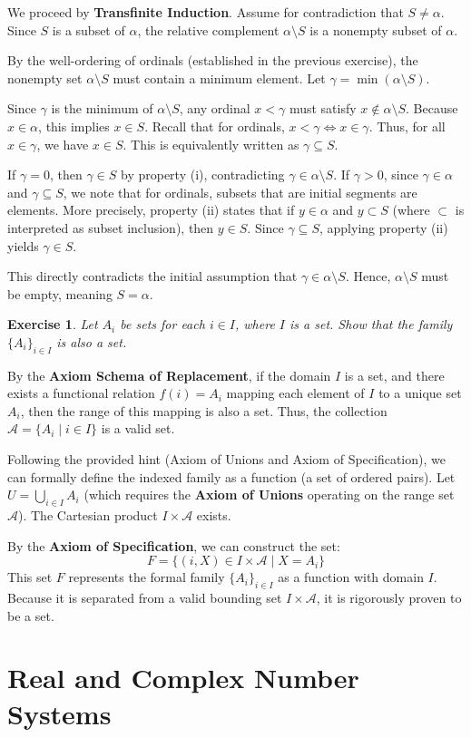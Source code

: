 \documentclass[12pt, a4paper]{article}
\makeatletter
\theoremstyle{break}
\newtheorem{exerciseitem}{Exercise}[section]
\newenvironment{exercise}
  {\begin{exerciseitem}\addcontentsline{toc}{subsection}{Exercise~\theexerciseitem}}
  {\end{exerciseitem}}
\renewenvironment{proof}[1][\proofname]{\par
  \pushQED{\qed}%
  \normalfont \topsep6\p@\@plus6\p@\relax
  \trivlist
  \item[\hskip\labelsep\bfseries #1\@addpunct{.}]\mbox{}\newline\ignorespaces
}{%
  \popQED\endtrivlist\@endpefalse
}
\newenvironment{solution}{\begin{proof}[Solution]}{\end{proof}}
\makeatother
\begin{document}
\begin{solution}
We proceed by \textbf{Transfinite Induction}. 
Assume for contradiction that \(S \neq \alpha\). Since \(S\) is a subset of \(\alpha\), the relative complement \(\alpha \setminus S\) is a nonempty subset of \(\alpha\). 

By the well-ordering of ordinals (established in the previous exercise), the nonempty set \(\alpha \setminus S\) must contain a minimum element. Let \(\gamma = \min(\alpha \setminus S)\).

Since \(\gamma\) is the minimum of \(\alpha \setminus S\), any ordinal \(x < \gamma\) must satisfy \(x \notin \alpha \setminus S\). Because \(x \in \alpha\), this implies \(x \in S\). 
Recall that for ordinals, \(x < \gamma \iff x \in \gamma\). Thus, for all \(x \in \gamma\), we have \(x \in S\). This is equivalently written as \(\gamma \subseteq S\). 

If \(\gamma = 0\), then \(\gamma \in S\) by property (i), contradicting \(\gamma \in \alpha \setminus S\).
If \(\gamma > 0\), since \(\gamma \in \alpha\) and \(\gamma \subseteq S\), we note that for ordinals, subsets that are initial segments are elements. More precisely, property (ii) states that if \(y \in \alpha\) and \(y \subset S\) (where \(\subset\) is interpreted as subset inclusion), then \(y \in S\). Since \(\gamma \subseteq S\), applying property (ii) yields \(\gamma \in S\).

This directly contradicts the initial assumption that \(\gamma \in \alpha \setminus S\). 
Hence, \(\alpha \setminus S\) must be empty, meaning \(S = \alpha\).
\end{solution}

\begin{exercise}\label{e1.28}
Let \(A_i\) be sets for each \(i \in I\), where \(I\) is a set. Show that the family \(\{A_i \}_{i\in I}\) is also a set.
\end{exercise}

\begin{solution}
By the \textbf{Axiom Schema of Replacement}, if the domain \(I\) is a set, and there exists a functional relation \(f(i) = A_i\) mapping each element of \(I\) to a unique set \(A_i\), then the range of this mapping is also a set. Thus, the collection \(\mathcal{A} = \{A_i \mid i \in I\}\) is a valid set.

Following the provided hint (Axiom of Unions and Axiom of Specification), we can formally define the indexed family as a function (a set of ordered pairs). Let \(U = \bigcup_{i \in I} A_i\) (which requires the \textbf{Axiom of Unions} operating on the range set \(\mathcal{A}\)). The Cartesian product \(I \times \mathcal{A}\) exists. 

By the \textbf{Axiom of Specification}, we can construct the set:
\[
F = \{(i, X) \in I \times \mathcal{A} \mid X = A_i\}
\]
This set \(F\) represents the formal family \(\{A_i\}_{i \in I}\) as a function with domain \(I\). Because it is separated from a valid bounding set \(I \times \mathcal{A}\), it is rigorously proven to be a set.
\end{solution}


\section{Real and Complex Number Systems}\label{real-and-complex-system}
\end{document}
